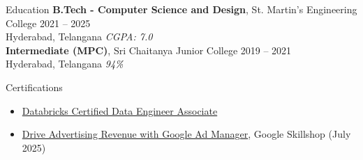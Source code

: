 \documentclass{resume}
\begin{document}
\vspace{-5pt}

\begin{rSection}{Education}
\textbf{B.Tech - Computer Science and Design}, St. Martin's Engineering College \hfill 2021 -- 2025 \\
Hyderabad, Telangana \hfill \textit{CGPA: 7.0} \\
\textbf{Intermediate (MPC)}, Sri Chaitanya Junior College \hfill 2019 -- 2021 \\
Hyderabad, Telangana \hfill \textit{94\%}
\end{rSection}

\vspace{-5pt}

\begin{rSection}{Certifications}
\begin{itemize}
  \item \href{https://credentials.databricks.com/ee9ab034-f9b9-4f25-ae76-005981614c88#acc.IYhsuiRg}{Databricks Certified Data Engineer Associate}
  \item \href{https://skillshop.credential.net/c2c7578c-dc32-4b31-8ff0-8d58fc3fed59#acc.NsFWmVTl}{Drive Advertising Revenue with Google Ad Manager}, Google Skillshop (July 2025)
\end{itemize}
\end{rSection}
\end{document}
